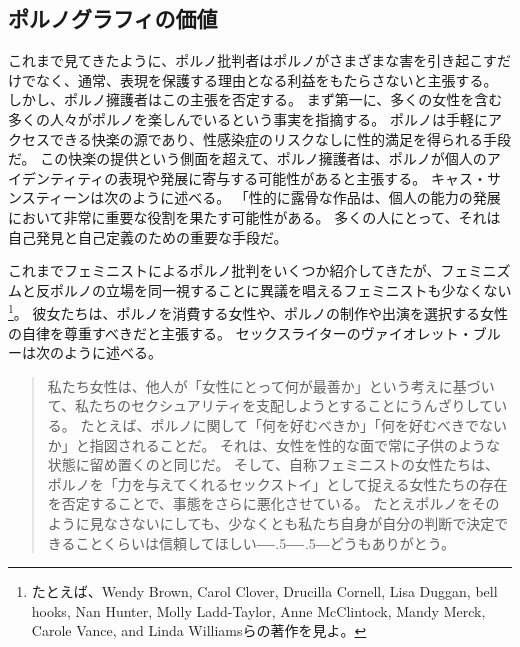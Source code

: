 \documentclass[paper=a4,book,openany]{jlreq}
\def\DDASH{―\kern-.5\zw―\kern-.5\zw―} %
\begin{document}
\subsection{ポルノグラフィの価値}

これまで見てきたように、ポルノ批判者はポルノがさまざまな害を引き起こすだけでなく、通常、表現を保護する理由となる利益をもたらさないと主張する。
しかし、ポルノ擁護者はこの主張を否定する。
まず第一に、多くの女性を含む多くの人々がポルノを楽しんでいるという事実を指摘する。
ポルノは手軽にアクセスできる快楽の源であり、性感染症のリスクなしに性的満足を得られる手段だ。
この快楽の提供という側面を超えて、ポルノ擁護者は、ポルノが個人のアイデンティティの表現や発展に寄与する可能性があると主張する。
キャス・サンスティーンは次のように述べる。
「性的に露骨な作品は、個人の能力の発展において非常に重要な役割を果たす可能性がある。
多くの人にとって、それは自己発見と自己定義のための重要な手段だ\citep[p.215]{sunstein95:_democ_probl_free_speec}。

これまでフェミニストによるポルノ批判をいくつか紹介してきたが、フェミニズムと反ポルノの立場を同一視することに異議を唱えるフェミニストも少なくない
\footnote{たとえば、Wendy Brown, Carol Clover, Drucilla Cornell, Lisa Duggan, bell hooks, Nan Hunter, Molly Ladd-Taylor, Anne McClintock, Mandy Merck, Carole Vance, and Linda Williamsらの著作を見よ。
}。
彼女たちは、ポルノを消費する女性や、ポルノの制作や出演を選択する女性の自律を尊重すべきだと主張する。
セックスライターのヴァイオレット・ブルーは次のように述べる。

\begin{quote}
私たち女性は、他人が「女性にとって何が最善か」という考えに基づいて、私たちのセクシュアリティを支配しようとすることにうんざりしている。
たとえば、ポルノに関して「何を好むべきか」「何を好むべきでないか」と指図されることだ。
それは、女性を性的な面で常に子供のような状態に留め置くのと同じだ。
そして、自称フェミニストの女性たちは、ポルノを「力を与えてくれるセックストイ」として捉える女性たちの存在を否定することで、事態をさらに悪化させている。
たとえポルノをそのように見なさないにしても、少なくとも私たち自身が自分の判断で決定できることくらいは信頼してほしい{\DDASH}どうもありがとう。
\citep{clark-flory10}
\end{quote}
\end{document}
